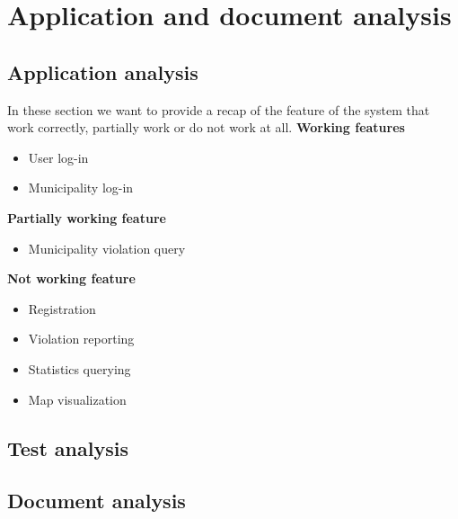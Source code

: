 \documentclass[../ATD.tex]{subfiles}
\begin{document}
    \chapter{Application and document analysis}\label{ch:application-and-document-analysis}
    \section{Application analysis}\label{sec:application-analysis}
    In these section we want to provide a recap of the feature of the system that work correctly, partially work or do not work at all.
    \newline
    \textbf{Working features}
    \begin{itemize}
        \item User log-in
        \item Municipality log-in
    \end{itemize}
    \newline
    \textbf{Partially working feature}
    \begin{itemize}
        \item Municipality violation query
    \end{itemize}
    \newline
    \textbf{Not working feature}
    \begin{itemize}
        \item Registration
        \item Violation reporting
        \item Statistics querying
        \item Map visualization
    \end{itemize}

    \section{Test analysis}\label{sec:test-analysis}


    \section{Document analysis}\label{sec:document-analysis}

\end{document}
